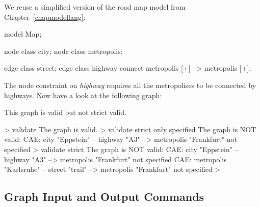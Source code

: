 \begin{example}
We reuse a simplified version of the road map model from Chapter~\ref{chapmodellang}:
\begin{grgen}
model Map;

node class city;
node class metropolis;

edge class street;
edge class highway
      connect metropolis [+] --> metropolis [+];
\end{grgen}
The node constraint on \emph{highway} requires all the metropolises to be connected by highways. Now have a look at the following graph:
\begin{center}
\end{center}

This graph is valid but not strict valid.
\begin{grshell}
> validate
The graph is valid.
> validate strict only specified
The graph is NOT valid:
  CAE: city "Eppstein" -- highway "A3" --> metropolis "Frankfurt" not specified
> validate strict
The graph is NOT valid:
  CAE: city "Eppstein" -- highway "A3" --> metropolis "Frankfurt" not specified
  CAE: metropolis "Karlsruhe" -- street "trail" --> metropolis "Frankfurt" not specified
>
\end{grshell}
\end{example}


\pagebreak

\subsection{Graph Input and Output Commands}
\label{outputcmds}

